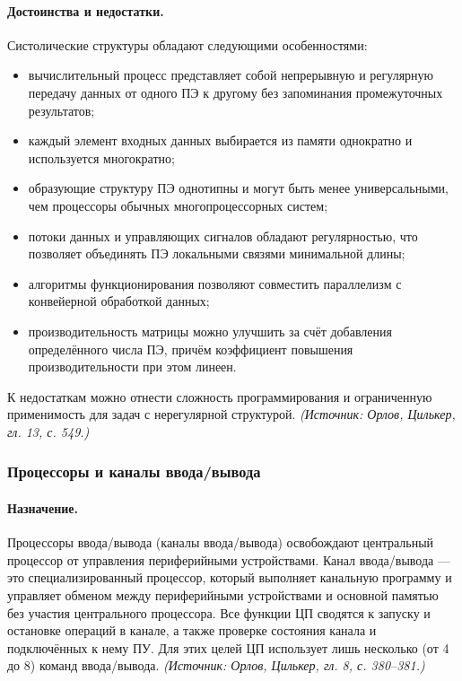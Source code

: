 \documentclass[a4paper,12pt]{article}
\begin{document}
\paragraph{Достоинства и недостатки.}
Систолические структуры обладают следующими особенностями:
\begin{itemize}
\item вычислительный процесс представляет собой непрерывную и регулярную передачу данных от одного ПЭ к другому без запоминания промежуточных результатов;
\item каждый элемент входных данных выбирается из памяти однократно и используется многократно;
\item образующие структуру ПЭ однотипны и могут быть менее универсальными, чем процессоры обычных многопроцессорных систем;
\item потоки данных и управляющих сигналов обладают регулярностью, что позволяет объединять ПЭ локальными связями минимальной длины;
\item алгоритмы функционирования позволяют совместить параллелизм с конвейерной обработкой данных;
\item производительность матрицы можно улучшить за счёт добавления определённого числа ПЭ, причём коэффициент повышения производительности при этом линеен.
\end{itemize}
К недостаткам можно отнести сложность программирования и ограниченную применимость для задач с нерегулярной структурой.
\textit{(Источник: Орлов, Цилькер, гл. 13, с. 549.)}

\subsubsection{Процессоры и каналы ввода/вывода}

\paragraph{Назначение.}
Процессоры ввода/вывода (каналы ввода/вывода) освобождают центральный процессор от управления периферийными устройствами. Канал ввода/вывода — это специализированный процессор, который выполняет канальную программу и управляет обменом между периферийными устройствами и основной памятью без участия центрального процессора. Все функции ЦП сводятся к запуску и остановке операций в канале, а также проверке состояния канала и подключённых к нему ПУ. Для этих целей ЦП использует лишь несколько (от 4 до 8) команд ввода/вывода.
\textit{(Источник: Орлов, Цилькер, гл. 8, с. 380--381.)}
\end{document}
